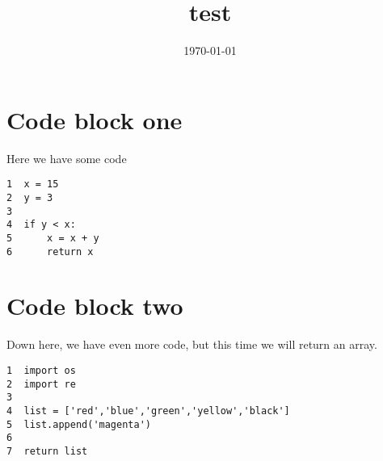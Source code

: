 \documentclass[11pt]{article}
\date{\today}
\title{test}
\begin{document}
\maketitle
\tableofcontents

\section{Code block one}
\label{sec-1}
Here we have some code
\begin{verbatim}
1  x = 15
2  y = 3
3  
4  if y < x:
5      x = x + y
6      return x
\end{verbatim}

\section{Code block two}
\label{sec-2}
Down here, we have even more code, but this time we will return an array.
\begin{verbatim}
1  import os
2  import re
3  
4  list = ['red','blue','green','yellow','black']
5  list.append('magenta')
6  
7  return list
\end{verbatim}
\end{document}
